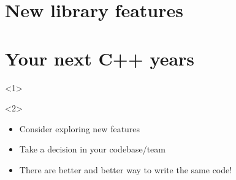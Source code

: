 \documentclass[usenames,dvipsnames,svgnames,14pt]{beamer}
\begin{document}
    \part{New library features}
    
    \part{Your next C++ years}
    \begin{frame}{}
        \begin{onlyenv}<1>
        \end{onlyenv}
        \vspace{5mm}
        \begin{overlayarea}{\textwidth}{0.23\textheight}
            \begin{onlyenv}<2>
                \begin{itemize}
                    \item Consider exploring new features
                    \item Take a decision in your codebase/team
                    \item There are better and better way to write the same code!
                \end{itemize}

\end{onlyenv}
\end{overlayarea}
\end{frame}
\end{document}

